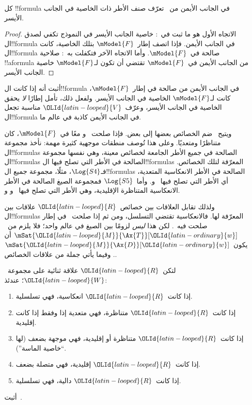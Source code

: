 \documentclass[../../../include/open-logic-section]{subfiles}
\begin{document}
\begin{cor}
كل !!{formula} في الجانب الأيمن من~ تعرّف صنف
الأطر ذات الخاصية في الجانب الأيسر.
\end{cor}

\begin{proof}
  الاتجاه الأول هو ما ثبت في~:
  خاصية الجانب الأيسر في النموذج تكفي لصدق ال!!{formula}
  في الجانب الأيمن. فإذا اتصف إطار~$\mModel{F}$ بتلك الخاصية،
  كانت ال!!{formula} صالحة في~$\mModel{F}$.
  وأما الاتجاه الآخر فتكفلت به~:
  صلاحية !!a{formula} من الجانب الأيمن في~$\mModel{F}$
  تقتضي أن تكون لـ$\mModel{F}$ خاصية الجانب الأيسر.
\end{proof}

\begin{prob}
أثبت أنه إذا كانت ال!!{formula} في الجانب الأيمن من
 صالحة في إطار~$\mModel{F}$،
كانت لـ$\mModel{F}$ الخاصية في الجانب الأيسر. ولفعل ذلك، تأمل إطارًا
\emph{لا} يحقق الخاصية في الجانب الأيسر، وعرّف~${\OLId{latin-looped}{V}}$ مناسبة تجعل
ال!!{formula} في الجانب الأيمن كاذبة في عالم ما.
\end{prob}

ويتيح~ ضم الخصائص بعضها إلى بعض.
فإذا صلحت~ و معًا في~$\mModel{F}$، كان متناظرًا
ومتعديًا. وعلى هذا تُوصف منطقات موجهية كثيرة مهمة:
نأخذ مجموعة ال!!{formula}s الصالحة في جميع الأطر الجامعة
لخصائص معينة، وهي نفسها مجموعة ال!!{formula}s الصالحة في
الأطر التي تصلح فيها ال!!{formula}s المعرّفة لتلك الخصائص.
فـ$\Log{S4}$، مثلًا، مجموعة جميع ال!!{formula}s الصالحة في
الأطر الانعكاسية المتعدية، أي الأطر التي تصلح فيها~ و.
وأما~$\Log{S5}$ فمجموعة الصيغ الصالحة في الأطر الانعكاسية
المتناظرة الإقليدية، وهي الأطر التي تصلح فيها~ و و.

ولذلك تقابل العلاقات بين خصائص~${\OLId{latin-looped}{R}}$ علاقات بين ال!!{formula}s
المعرّفة لها. فالانعكاسية تقتضي التسلسل، ومن ثم إذا صلحت~
في إطار صلحت فيه~. لكن هذا \emph{ليس} لزومًا بين الصيغ
في عالم واحد؛ فلا يلزم من~$\mSat{{\OLId{latin-looped}{M}}}{\Ax{T}}[{\OLId{latin-ordinary}{w}}]$
أن يكون~$\mSat{{\OLId{latin-looped}{M}}}{\Ax{D}}[{\OLId{latin-ordinary}{w}}]$. وفيما يأتي جملة من علاقات الخصائص.

\begin{prop}
  لتكن~${\OLId{latin-looped}{R}}$ علاقة ثنائية على مجموعة~${\OLId{latin-looped}{W}}$؛ عندئذ:
  \begin{enumerate}
  \item إذا كانت~${\OLId{latin-looped}{R}}$ انعكاسية، فهي تسلسلية.
  \item إذا كانت~${\OLId{latin-looped}{R}}$ متناظرة، فهي متعدية إذا وفقط إذا كانت إقليدية.
  \item إذا كانت~${\OLId{latin-looped}{R}}$ متناظرة أو إقليدية، فهي موجهة بضعف (لها ``خاصية
    الماسة'').
  \item إذا كانت~${\OLId{latin-looped}{R}}$ إقليدية، فهي متصلة بضعف.
  \item إذا كانت~${\OLId{latin-looped}{R}}$ دالية، فهي تسلسلية.
  \end{enumerate}
\end{prop}

\begin{prob}
  أثبت~.
\end{prob}
\end{document}
